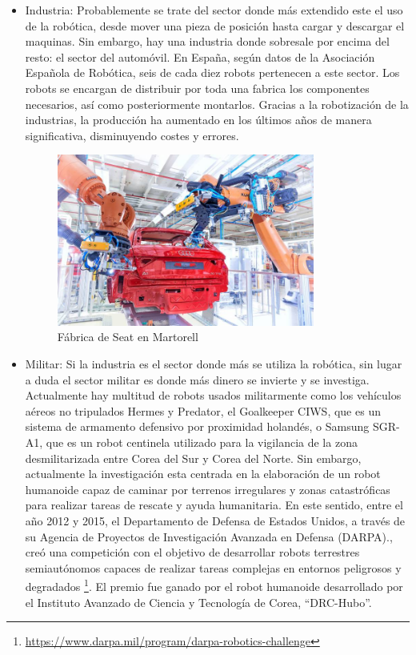 \begin{itemize}
\begin{figure}[H]
\begin{center}
		\label{fig.sistemadavinci}
		\end{center}
\end{figure}
\item Industria: Probablemente se trate del sector donde más extendido este el uso de la robótica, desde mover una pieza de posición hasta cargar y descargar el maquinas. Sin embargo, hay una industria donde sobresale por encima del resto: el sector del automóvil. En España, según datos de la Asociación Española de Robótica, seis de cada diez robots pertenecen a este sector. Los robots se encargan de distribuir por toda una fabrica los componentes necesarios, así como posteriormente montarlos. Gracias a la robotización de la industrias, la producción ha aumentado en los últimos años de manera significativa, disminuyendo costes y errores.
\begin{figure}[H]
  \begin{center}
    \includegraphics[width=0.8\textwidth]{figures/robotautomovil.jpg}
		\caption{Fábrica de Seat en Martorell}
		\label{fig.robotautomovil}
		\end{center}
\end{figure}
\item Militar: Si la industria es el sector donde más se utiliza la robótica, sin lugar a duda el sector militar es donde más dinero se invierte y se investiga. Actualmente hay multitud de robots usados militarmente como los vehículos aéreos no tripulados Hermes y Predator, el Goalkeeper CIWS, que es un sistema de armamento defensivo por proximidad holandés, o Samsung SGR-A1, que es un robot centinela utilizado para la vigilancia de la zona desmilitarizada entre Corea del Sur y Corea del Norte. Sin embargo, actualmente la investigación esta centrada en la elaboración de un robot humanoide capaz de caminar por terrenos irregulares y zonas catastróficas para realizar tareas de rescate y ayuda humanitaria. En este sentido, entre el año 2012 y 2015, el Departamento de Defensa de Estados Unidos, a través de su Agencia de Proyectos  de Investigación Avanzada en Defensa (DARPA)., creó una competición con el objetivo de desarrollar robots terrestres semiautónomos capaces de realizar tareas complejas en entornos peligrosos y degradados \footnote{\url{https://www.darpa.mil/program/darpa-robotics-challenge}}. El premio fue ganado por el robot humanoide desarrollado por el Instituto Avanzado de Ciencia y Tecnología de Corea, ``DRC-Hubo''.

\end{itemize}
